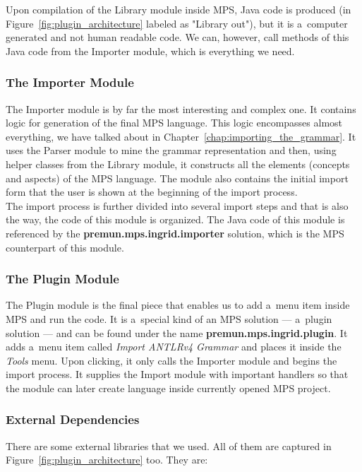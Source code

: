 Upon compilation of the Library module inside MPS, Java code is produced (in Figure~\ref{fig:plugin_architecture} labeled as "Library out"), but it is a~computer generated and not human readable code.
We can, however, call methods of this Java code from the Importer module, which is everything we need.

\subsubsection{The Importer Module}

The Importer module is by far the most interesting and complex one.
It contains logic for generation of the final MPS language.
This logic encompasses almost everything, we have talked about in Chapter~\ref{chap:importing_the_grammar}.
It uses the Parser module to mine the grammar representation and then, using helper classes from the Library module, it constructs all the elements (concepts and aspects) of the MPS language.
The module also contains the initial import form that the user is shown at the beginning of the import process.
\\

The import process is further divided into several import steps and that is also the way, the code of this module is organized.
The Java code of this module is referenced by the \textbf{premun.mps.ingrid.importer} solution, which is the MPS counterpart of this module.

\subsubsection{The Plugin Module}

The Plugin module is the final piece that enables us to add a~menu item inside MPS and run the code.
It is a~special kind of an MPS solution --- a~plugin solution --- and can be found under the name \textbf{premun.mps.ingrid.plugin}.
It adds a~menu item called \textit{Import ANTLRv4 Grammar} and places it inside the \textit{Tools} menu.
Upon clicking, it only calls the Importer module and begins the import process.
It supplies the Import module with important handlers so that the module can later create language inside currently opened MPS project.

\subsubsection{External Dependencies}

There are some external libraries that we used.
All of them are captured in Figure~\ref{fig:plugin_architecture} too.
They are:

